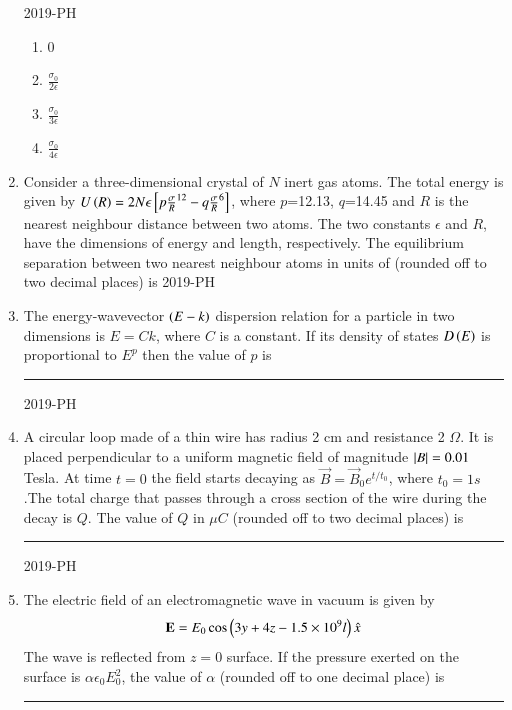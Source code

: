 \documentclass[journal,12pt,onecolumn]{IEEEtran}
\theoremstyle{remark}
\begin{document}
\begin{enumerate}
\hfill{2019-PH}

	\begin{multicols}{4}
	\begin{enumerate}
		\item 0
		\item $\frac{\sigma_{0}}{2\epsilon}$
		\item $\frac{\sigma_{0}}{3\epsilon}$
		\item $\frac{\sigma_{0}}{4\epsilon}$
	\end{enumerate}
	\end{multicols}

\item Consider a three-dimensional crystal of $N$ inert gas atoms. The total energy is given by $U\left(R\right)=2N \epsilon {}\left[p\frac{\sigma}{R}^{12}-q\frac{\sigma}{R}^{6}\right]$, where $p$=12.13, $q$=14.45 and $R$ is the nearest neighbour distance between two atoms. The two constants $\epsilon$ and $R$, have the dimensions of energy and length, respectively. The equilibrium separation between two nearest neighbour atoms in units of (rounded off to two decimal places) is 
\hfill{2019-PH}


\item The energy-wavevector $\left(E-k\right)$ dispersion relation for a particle in two dimensions is $E = Ck$, where $C$ is a constant. If its density of states $D\left(E\right)$ is proportional to $E^p$ then the value of $p$ is \rule{1cm}{0.2pt}

\hfill{2019-PH}


\item  A circular loop made of a thin wire has radius 2 cm and resistance 2 $\Omega$. It is placed perpendicular to a uniform magnetic field of magnitude $\left\vert B\right\vert=0.01$ Tesla. At time $t=0$ the field starts decaying as $\vec{B}=\vec{B}_{0} e^{t/t_{0}}$, where $t_{0}=1s$.The total charge that passes through a cross section of the wire during the decay is $Q$. The value of $Q$ in $\mu C$ (rounded off to two decimal places) is \rule{1cm}{0.2pt}

\hfill{2019-PH}

\item The electric field of an electromagnetic wave in vacuum is given by 
	\begin{align*}
	\mathbf{E}=E_{0} \cos \left(3y+4z-1.5 \times 10^{9}l\right) \hat{x}
	\end{align*}
The wave is reflected from $z=0$ surface. If the pressure exerted on the surface is $\alpha \epsilon_{0} E_{0}^{2}$, the value of $\alpha$ (rounded off to one decimal place) is \rule{1cm}{0.2pt}


\end{enumerate}
\end{document}
